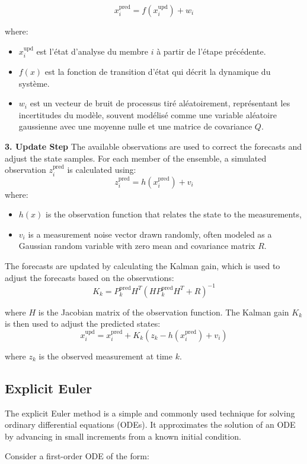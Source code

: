 \documentclass[a4paper,12pt,french]{article}
\begin{document}
   $$x_i^{\text{pred}} = f(x_i^{\text{upd}}) + w_i$$

   where:
   \begin{itemize}
    \item ${x}_i^{\text{upd}}$ est l'état d'analyse du membre $i$ à partir de l'étape précédente.
    \item $f(x)$ est la fonction de transition d'état qui décrit la dynamique du système.
    \item $w_i$ est un vecteur de bruit de processus tiré aléatoirement, représentant les incertitudes du modèle, souvent modélisé comme une variable aléatoire gaussienne avec une moyenne nulle et une matrice de covariance $Q$.
   \end{itemize}
\textbf{3. Update Step}  
   The available observations are used to correct the forecasts and adjust the state samples. For each member of the ensemble, a simulated observation $z_i^{\text{pred}}$ is calculated using:
   $$z_i^{\text{pred}} = h(x_i^{\text{pred}}) + v_i$$
   where:
   \begin{itemize}
    \item $h(x)$ is the observation function that relates the state to the measurements,
    \item $v_i$  is a measurement noise vector drawn randomly, often modeled as a Gaussian random variable with zero mean and covariance matrix $R$.
   \end{itemize}


   The forecasts are updated by calculating the Kalman gain, which is used to adjust the forecasts based on the observations:
   $$K_k = P_k^{\text{pred}} H^T (H P_k^{\text{pred}} H^T + R)^{-1}$$

   where $H$ is the Jacobian matrix of the observation function. The Kalman gain $K_k$ is then used to adjust the predicted states:
   $$ x_i^{\text{upd}} = x_i^{\text{pred}} + K_k (z_k - h(x_i^{\text{pred}}) + v_i)$$

   where $z_k$ is the observed measurement at time $k$.
\subsection{Explicit Euler}

The explicit Euler method is a simple and commonly used technique for solving ordinary differential equations (ODEs). It approximates the solution of an ODE by advancing in small increments from a known initial condition.

Consider a first-order ODE of the form:
\end{document}
